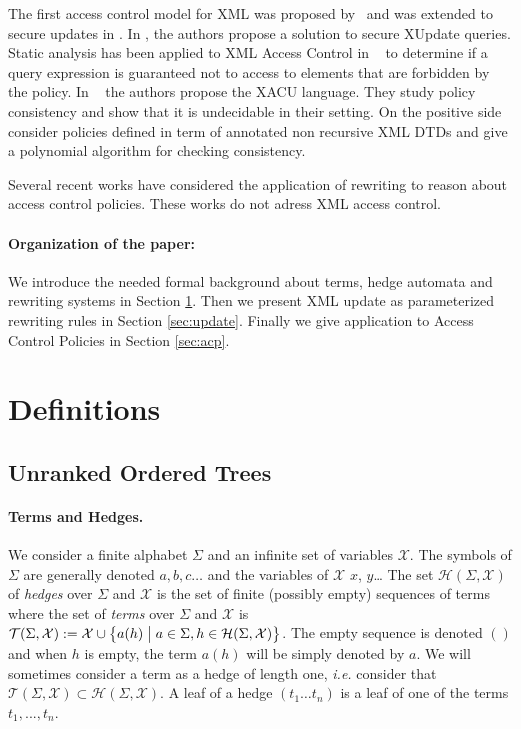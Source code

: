 \documentclass[a4paper]{article}
\newcommand{\remarque}[1]{}
\theoremstyle{plain}
\newcommand{\T}{\mathcal{T}}
\renewcommand{\H}{\mathcal{H}}
\newcommand{\X}{\mathcal{X}}
\newcommand{\F}{\Sigma}
\begin{document}
The first access control model for XML was proposed by~\cite{DamianiVPS00} 
and was extended to secure updates in \cite{Lim03}. In \cite{Gabillon05}, the authors propose a solution to secure XUpdate queries.
Static analysis has been applied to XML Access Control in ~\cite{Murata06} to determine if a query expression 
is guaranteed not to access to elements that are forbidden by the policy. 
In ~\cite{FundulakiManeth07} the authors propose the XACU language. 
They study  policy consistency and show that it is undecidable in their setting. 
On the positive side~\cite{Bravo08} consider policies defined in term of annotated non recursive XML DTDs 
and give a polynomial algorithm for checking consistency. 
\remarque{c'est sur?}

Several recent works have considered the 
application of rewriting to reason about  
access control policies. These works do not adress  XML access control. 


\paragraph{Organization of the paper:} We introduce the needed 
formal background about terms, hedge automata and rewriting systems 
in Section \ref{sec:def}. Then we present XML update as parameterized  rewriting 
rules in Section \ref{sec:update}. Finally we give application to Access Control 
Policies in Section \ref{sec:acp}.

\section{Definitions}
\label{sec:def}

\subsection{Unranked Ordered Trees}

\paragraph{Terms and Hedges.}
We consider a finite alphabet $\F$ and an infinite set of variables $\X$.
The symbols of $\Sigma$ are generally denoted $a,b,c\ldots$ and the variables of
$\X$ $x$, $y$\ldots
The set $\H(\F, \X)$ of \emph{hedges} over $\F$ and $\X$ 
is the set of finite (possibly empty) sequences of terms
where the set of \emph{terms} over $\F$ and $\X$ is 
$\T(\F, \X) := \X \cup \bigl\{ a(h) \bigm| a \in \F, h \in \H(\F, \X) \bigr\}$.
The empty sequence is denoted $()$ and 
when $h$ is empty, the term $a(h)$ will be simply denoted by $a$.
We will sometimes consider a term as a hedge of length one, 
\textit{i.e.} consider that $\T(\F, \X) \subset \H(\F, \X)$.
A leaf of a hedge $(t_1\ldots t_n)$ is a leaf of one of the terms $t_1,..., t_n$.
\end{document}
